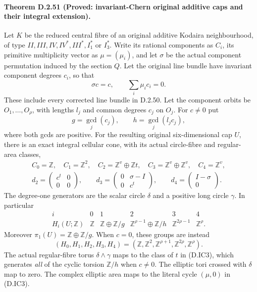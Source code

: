 \paragraph{Theorem D.2.51 (Proved: invariant-Chern original additive caps and their integral extension).}
Let $K$ be the reduced central fibre of an original additive
Kodaira neighbourhood, of type
$II,III,IV,IV^*,III^*,I_1^*$ or $I_3^*$.
Write its rational components as $C_i$, its primitive
multiplicity vector as $\mu=(\mu_i)$, and let $\sigma$
be the actual component permutation induced by the section $Q$.
Let the original line bundle have invariant component degrees
$c_i$, so that
\[
                  \sigma c=c,\qquad \sum_i\mu_i c_i=0.
                                                        \tag{D.IC1}
\]
These include every corrected line bundle in D.2.50.
Let the component orbits be $O_1,\ldots,O_\rho$, with
lengths $l_j$ and common degrees $c_j$ on $O_j$.
For $c\ne0$ put
\[
                  g=\gcd_j(c_j),\qquad
                  h=\gcd_j(l_jc_j),
                                                        \tag{D.IC2}
\]
where both gcds are positive. For the resulting original
six-dimensional cap $U$, there is an exact integral cellular
cone, with its actual circle-fibre and regular-area classes,
\[
\begin{gathered}
 C_0=\mathbb Z,\quad C_1=\mathbb Z^2,\quad
 C_2=\mathbb Z^v\oplus\mathbb Zt,\quad
 C_3=\mathbb Z^v\oplus\mathbb Z^v,\quad C_4=\mathbb Z^v,\\
 d_2=\begin{pmatrix}c^t&0\\0&0\end{pmatrix},\qquad
 d_3=\begin{pmatrix}0&\sigma-I\\0&c^t\end{pmatrix},\qquad
 d_4=\begin{pmatrix}I-\sigma\\0\end{pmatrix}.
\end{gathered}                                             \tag{D.IC3}
\]
The degree-one generators are the scalar circle $\delta$
and a positive long circle $\gamma$. In particular
\[
\begin{array}{c|ccccc}
i&0&1&2&3&4\\\hline
H_i(U;\mathbb Z)&\mathbb Z&
\mathbb Z\oplus\mathbb Z/g&
\mathbb Z^{\rho-1}\oplus\mathbb Z/h&
\mathbb Z^{2\rho-1}&\mathbb Z^\rho .
\end{array}                                               \tag{D.IC4}
\]
Moreover $\pi_1(U)=\mathbb Z\oplus\mathbb Z/g$.
When $c=0$, these groups are instead
\[
 (H_0,H_1,H_2,H_3,H_4)=
 (\mathbb Z,\mathbb Z^2,\mathbb Z^{\rho+1},
                         \mathbb Z^{2\rho},\mathbb Z^\rho).
                                                        \tag{D.IC5}
\]
The actual regular-fibre torus $\delta\wedge\gamma$
maps to the class of $t$ in (D.IC3), which generates
\emph{all} of the cyclic torsion $\mathbb Z/h$ when
$c\ne0$. The elliptic tori crossed with $\delta$ map
to zero. The complex elliptic area maps to the literal
cycle $(\mu,0)$ in (D.IC3).

